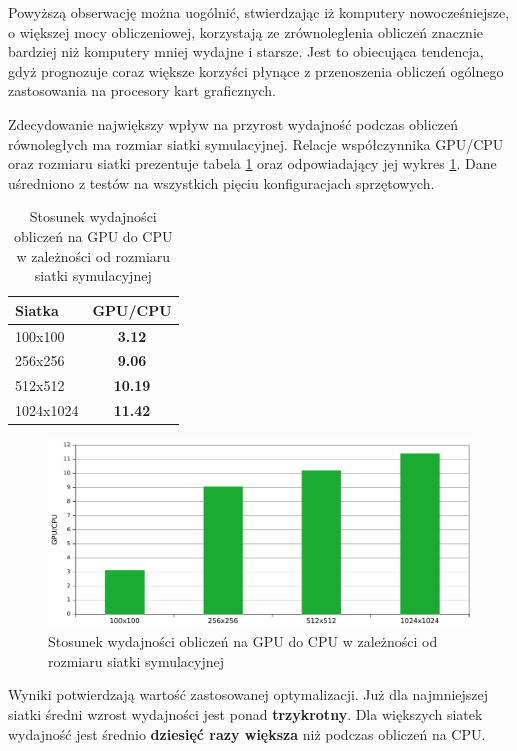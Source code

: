 Powyższą obserwację można uogólnić, stwierdzając iż komputery nowocześniejsze,
o większej mocy obliczeniowej, korzystają ze zrównoleglenia obliczeń znacznie
bardziej niż komputery mniej wydajne i starsze. Jest to obiecująca tendencja,
gdyż prognozuje coraz większe korzyści płynące z przenoszenia obliczeń
ogólnego zastosowania na procesory kart graficznych.

Zdecydowanie największy wpływ na przyrost wydajność podczas obliczeń
równoległych ma rozmiar siatki symulacyjnej. Relacje współczynnika GPU/CPU oraz
rozmiaru siatki prezentuje tabela \ref{tab:gpucpu} oraz odpowiadający jej wykres
\ref{fig:gpucpu}. Dane uśredniono z testów na wszystkich pięciu konfiguracjach
sprzętowych.

\begin{table}[!htp]
\caption{Stosunek wydajności obliczeń na GPU do CPU w zależności od rozmiaru
siatki symulacyjnej}
\centering
\begin{tabular}{|l|>{\bfseries}c|}
\hline
\cellcolor{t} Siatka & \cellcolor{gc} GPU/CPU \\ \hline
100x100 & 3.12 \\ \hline
256x256	& 9.06 \\ \hline
512x512	& 10.19 \\ \hline
1024x1024 & 11.42 \\ \hline
\end{tabular}
\label{tab:gpucpu}
\end{table}

\begin{figure}[!h]
\centering
\includegraphics[width=\textwidth]{img/gpucpu}
\caption{Stosunek wydajności obliczeń na GPU do CPU w zależności od rozmiaru
siatki symulacyjnej}
\label{fig:gpucpu}
\end{figure}

Wyniki potwierdzają wartość zastosowanej optymalizacji. Już dla najmniejszej
siatki średni wzrost wydajności jest ponad \textbf{trzykrotny}. Dla większych
siatek wydajność jest średnio \textbf{dziesięć razy większa} niż podczas
obliczeń na CPU.

